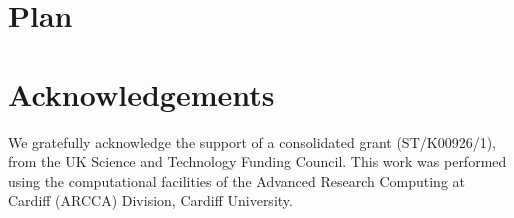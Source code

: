 \documentclass[usenatbib]{mn2e}
\numberwithin{equation}{section}
\begin{document}
\section{Plan}



\vspace{2.0cm}

\section*{Acknowledgements}

We gratefully acknowledge the support of a consolidated grant (ST/K00926/1), from the UK Science and Technology Funding Council. This work was performed using the computational facilities of the Advanced Research Computing at Cardiff (ARCCA) Division, Cardiff University. 




\appendix



\label{lastpage}
\end{document}
